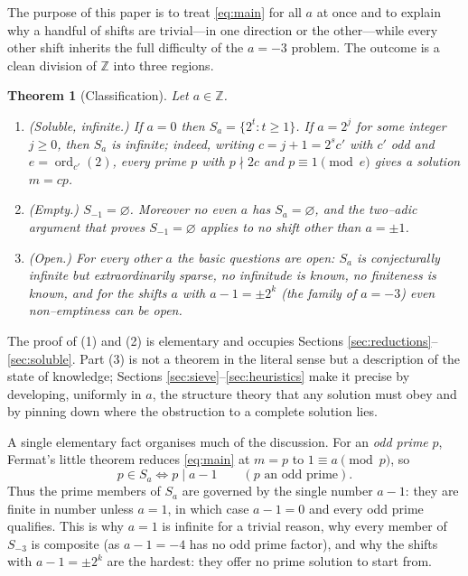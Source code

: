 \documentclass[11pt,reqno]{amsart}
\theoremstyle{plain}
\newtheorem{theorem}{Theorem}
\theoremstyle{definition}
\theoremstyle{remark}
\newcommand{\Z}{\mathbb{Z}}
\newcommand{\ord}{\operatorname{ord}}
\newcommand{\dvd}{\mid}
\newcommand{\Sa}{S_a}
\begin{document}
The purpose of this paper is to treat \eqref{eq:main} for all $a$ at once and to explain why a handful of shifts are trivial---in one direction or the other---while every other shift inherits the full difficulty of the $a=-3$ problem. The outcome is a clean division of $\Z$ into three regions.

\begin{theorem}[Classification]\label{thm:main}
Let $a\in\Z$.
\begin{enumerate}
\item\emph{(Soluble, infinite.)} If $a=0$ then $\Sa=\{2^{t}:t\ge1\}$. If $a=2^{j}$ for some integer $j\ge0$, then $\Sa$ is infinite; indeed, writing $c=j+1=2^{s}c'$ with $c'$ odd and $e=\ord_{c'}(2)$, every prime $p$ with $p\nmid 2c$ and $p\equiv1\pmod e$ gives a solution $m=cp$.
\item\emph{(Empty.)} $S_{-1}=\varnothing$. Moreover no even $a$ has $\Sa=\varnothing$, and the two--adic argument that proves $S_{-1}=\varnothing$ applies to no shift other than $a=\pm1$.
\item\emph{(Open.)} For every other $a$ the basic questions are open: $\Sa$ is conjecturally infinite but extraordinarily sparse, no infinitude is known, no finiteness is known, and for the shifts $a$ with
 $a-1=\pm2^{k}$ (the family of $a=-3$) even non--emptiness can be open.
\end{enumerate}
\end{theorem}

The proof of (1) and (2) is elementary and occupies Sections \ref{sec:reductions}--\ref{sec:soluble}. Part (3) is not a theorem in the literal sense but a description of the state of knowledge; Sections \ref{sec:sieve}--\ref{sec:heuristics} make it precise by developing, uniformly in $a$, the structure theory that any solution must obey and by pinning down where the obstruction to a complete solution lies.

A single elementary fact organises much of the discussion. For an \emph{odd prime} $p$, Fermat's little theorem reduces \eqref{eq:main} at $m=p$ to $1\equiv a\pmod p$, so
\begin{equation}\label{eq:primes}
p\in\Sa\iff p\dvd a-1\qquad(p\text{ an odd prime}).
\end{equation}
Thus the prime members of $\Sa$ are governed by the single number $a-1$: they are finite in number unless $a=1$, in which case $a-1=0$ and every odd prime qualifies. This is why $a=1$ is infinite for a trivial reason, why every member of $S_{-3}$ is composite (as $a-1=-4$ has no odd prime factor), and why the shifts with $a-1=\pm2^{k}$ are the hardest: they offer no prime solution to start from.
\end{document}
